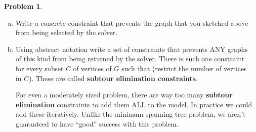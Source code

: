\documentclass[11pt]{article}
\theoremstyle{definition}
\newtheorem{problem}{Problem}
\newcommand{\answerbox}[3]{%
  \fbox{%
    \begin{minipage}[#1]{#2}
      \hfill\vspace{#3}
    \end{minipage}
  }
}
\newcommand{\answerboxone}[2]{%
  \answerbox{#1}{6.0in}{#2} 
}
\newcommand{\wordbox}{\answerbox{c}{1.2in}{.7cm}}
\begin{document}
\begin{problem}
\begin{enumerate}[(a)]
\answerboxone{c}{5cm}


\item Write a concrete constraint that prevents the graph that you sketched above from being selected by the solver.  

\answerboxone{c}{3cm}

\item Using abstract notation write a set of constraints that prevents ANY graphs of this kind from being returned by the solver.  There is such one constraint for every subset $C$ of vertices of $G$ such that \wordbox (restrict the number of vertices in $C$).  These are called \textbf{subtour elimination constraints}.

\answerboxone{c}{3cm}

\begin{tcolorbox}
For even a moderately sized problem, there are way too many \textbf{subtour elimination} constraints to add them ALL to the model.  In practice we could add these iteratively. Unlike the minimum spanning tree problem, we aren't guaranteed to have ``good'' success with this problem.  
\end{tcolorbox}

\end{enumerate}

\end{problem}
\end{document}
